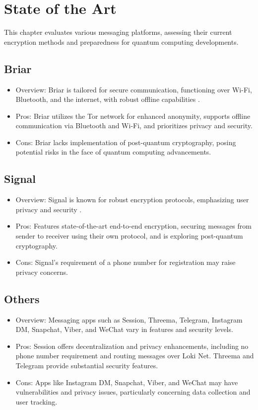 \chapter{State of the Art}

This chapter evaluates various messaging platforms, assessing their current encryption methods and preparedness for quantum computing developments.

\section{Briar}
    \begin{itemize}
      \item Overview: Briar is tailored for secure communication, functioning over Wi-Fi, Bluetooth, and the internet, with robust offline capabilities \cite{briarproject}.
      \item Pros: Briar utilizes the Tor network for enhanced anonymity, supports offline communication via Bluetooth and Wi-Fi, and prioritizes privacy and security.
      \item Cons: Briar lacks implementation of post-quantum cryptography, posing potential risks in the face of quantum computing advancements.
    \end{itemize}

\section{Signal}
    \begin{itemize}
      \item Overview: Signal is known for robust encryption protocols, emphasizing user privacy and security \cite{signal}.
      \item Pros: Features state-of-the-art end-to-end encryption, securing messages from sender to receiver using their own protocol, and is exploring post-quantum cryptography.
      \item Cons: Signal's requirement of a phone number for registration may raise privacy concerns.
    \end{itemize}

\section{Others}
    \begin{itemize}
      \item Overview: Messaging apps such as Session, Threema, Telegram, Instagram DM, Snapchat, Viber, and WeChat vary in features and security levels.
      \item Pros: Session offers decentralization and privacy enhancements, including no phone number requirement and routing messages over Loki Net. Threema and Telegram provide substantial security features.
      \item Cons: Apps like Instagram DM, Snapchat, Viber, and WeChat may have vulnerabilities and privacy issues, particularly concerning data collection and user tracking.
    \end{itemize}

